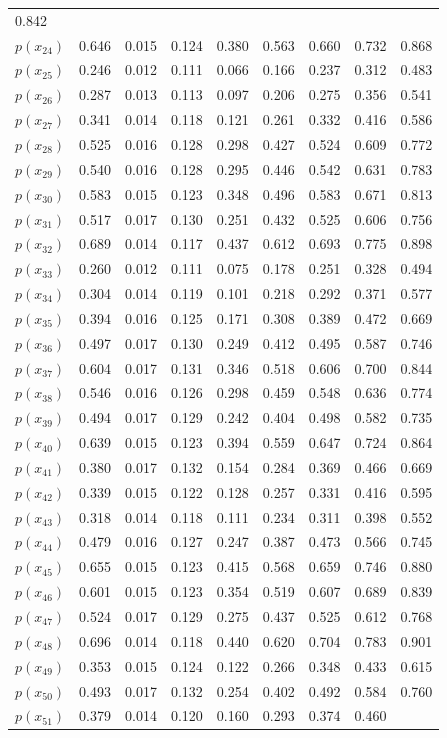 \documentclass[12pt,a4paper,UTF8,twoside]{book}
\theoremstyle{definition}
\theoremstyle{definition}
\theoremstyle{definition}
\theoremstyle{remark}
\begin{document}
\begin{longtable}[]{@{}lrrrrrrrr@{}}
0.842\tabularnewline
\(p(x_{24})\) & 0.646 & 0.015 & 0.124 & 0.380 & 0.563 & 0.660 & 0.732 &
0.868\tabularnewline
\(p(x_{25})\) & 0.246 & 0.012 & 0.111 & 0.066 & 0.166 & 0.237 & 0.312 &
0.483\tabularnewline
\(p(x_{26})\) & 0.287 & 0.013 & 0.113 & 0.097 & 0.206 & 0.275 & 0.356 &
0.541\tabularnewline
\(p(x_{27})\) & 0.341 & 0.014 & 0.118 & 0.121 & 0.261 & 0.332 & 0.416 &
0.586\tabularnewline
\(p(x_{28})\) & 0.525 & 0.016 & 0.128 & 0.298 & 0.427 & 0.524 & 0.609 &
0.772\tabularnewline
\(p(x_{29})\) & 0.540 & 0.016 & 0.128 & 0.295 & 0.446 & 0.542 & 0.631 &
0.783\tabularnewline
\(p(x_{30})\) & 0.583 & 0.015 & 0.123 & 0.348 & 0.496 & 0.583 & 0.671 &
0.813\tabularnewline
\(p(x_{31})\) & 0.517 & 0.017 & 0.130 & 0.251 & 0.432 & 0.525 & 0.606 &
0.756\tabularnewline
\(p(x_{32})\) & 0.689 & 0.014 & 0.117 & 0.437 & 0.612 & 0.693 & 0.775 &
0.898\tabularnewline
\(p(x_{33})\) & 0.260 & 0.012 & 0.111 & 0.075 & 0.178 & 0.251 & 0.328 &
0.494\tabularnewline
\(p(x_{34})\) & 0.304 & 0.014 & 0.119 & 0.101 & 0.218 & 0.292 & 0.371 &
0.577\tabularnewline
\(p(x_{35})\) & 0.394 & 0.016 & 0.125 & 0.171 & 0.308 & 0.389 & 0.472 &
0.669\tabularnewline
\(p(x_{36})\) & 0.497 & 0.017 & 0.130 & 0.249 & 0.412 & 0.495 & 0.587 &
0.746\tabularnewline
\(p(x_{37})\) & 0.604 & 0.017 & 0.131 & 0.346 & 0.518 & 0.606 & 0.700 &
0.844\tabularnewline
\(p(x_{38})\) & 0.546 & 0.016 & 0.126 & 0.298 & 0.459 & 0.548 & 0.636 &
0.774\tabularnewline
\(p(x_{39})\) & 0.494 & 0.017 & 0.129 & 0.242 & 0.404 & 0.498 & 0.582 &
0.735\tabularnewline
\(p(x_{40})\) & 0.639 & 0.015 & 0.123 & 0.394 & 0.559 & 0.647 & 0.724 &
0.864\tabularnewline
\(p(x_{41})\) & 0.380 & 0.017 & 0.132 & 0.154 & 0.284 & 0.369 & 0.466 &
0.669\tabularnewline
\(p(x_{42})\) & 0.339 & 0.015 & 0.122 & 0.128 & 0.257 & 0.331 & 0.416 &
0.595\tabularnewline
\(p(x_{43})\) & 0.318 & 0.014 & 0.118 & 0.111 & 0.234 & 0.311 & 0.398 &
0.552\tabularnewline
\(p(x_{44})\) & 0.479 & 0.016 & 0.127 & 0.247 & 0.387 & 0.473 & 0.566 &
0.745\tabularnewline
\(p(x_{45})\) & 0.655 & 0.015 & 0.123 & 0.415 & 0.568 & 0.659 & 0.746 &
0.880\tabularnewline
\(p(x_{46})\) & 0.601 & 0.015 & 0.123 & 0.354 & 0.519 & 0.607 & 0.689 &
0.839\tabularnewline
\(p(x_{47})\) & 0.524 & 0.017 & 0.129 & 0.275 & 0.437 & 0.525 & 0.612 &
0.768\tabularnewline
\(p(x_{48})\) & 0.696 & 0.014 & 0.118 & 0.440 & 0.620 & 0.704 & 0.783 &
0.901\tabularnewline
\(p(x_{49})\) & 0.353 & 0.015 & 0.124 & 0.122 & 0.266 & 0.348 & 0.433 &
0.615\tabularnewline
\(p(x_{50})\) & 0.493 & 0.017 & 0.132 & 0.254 & 0.402 & 0.492 & 0.584 &
0.760\tabularnewline
\(p(x_{51})\) & 0.379 & 0.014 & 0.120 & 0.160 & 0.293 & 0.374 & 0.460 &

\end{longtable}
\end{document}
